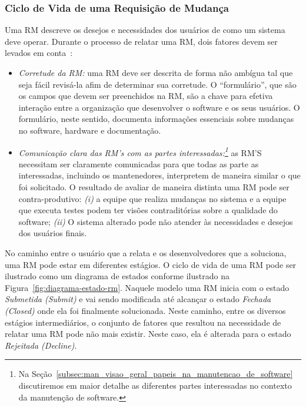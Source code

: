 \subsubsection{Ciclo de Vida de uma Requisição de Mudança}
\label{sub:fluxo_de_trabalho_requisicao_mudanca}

Uma RM descreve os desejos e necessidades dos usuários de como um sistema deve
operar. Durante o processo de relatar uma RM, dois fatores devem ser levados em
conta~\cite{tripathy2014software}:

\begin{itemize}
	\item \textit{Corretude da RM:} uma RM deve ser descrita de forma não
		ambígua tal que seja fácil revisá-la afim de determinar sua corretude. O
		``formulário'', que são os campos que devem ser preenchidos na RM, são a
		chave para efetiva interação entre a organização que desenvolver o
		software e os seus usuários. O formulário, neste sentido, documenta
		informações essenciais sobre mudanças no software, hardware e
		documentação.
   \item \textit{Comunicação clara das RM's com as partes
		   interessadas:\footnote{Na
			   Seção~\ref{subsec:man_visao_geral_papeis_na_manutencao_de_software}
			   discutiremos em maior detalhe as diferentes partes interessadas
			   no contexto da manutenção de software.}} as RM'S necessitam ser
	   claramente comunicadas para que todas as parte as interessadas, incluindo
	   os mantenedores, interpretem de maneira similar o que foi solicitado. O
	   resultado de avaliar de maneira distinta uma RM pode ser
	   contra-produtivo: \textit{(i)} a equipe que realiza mudanças no sistema e
	   a equipe que executa testes podem ter  visões contraditórias sobre a
	   qualidade do software; \textit{(ii)} O sistema alterado pode não atender
	   às necessidades e desejos dos usuários finais.
\end{itemize}

No caminho entre o usuário que a relata e os desenvolvedores que a soluciona,
uma RM pode estar em diferentes estágios. O ciclo de vida de uma RM pode ser
ilustrado como um diagrama de estados conforme ilustrado na
Figura~\ref{fig:diagrama-estado-rm}. Naquele modelo uma RM inicia com o estado
\textit{Submetida (Submit)} e vai sendo modificada até alcançar o estado
\textit{Fechada (Closed)} onde ela foi finalmente solucionada. Neste caminho,
entre os diversos estágios intermediários, o conjunto de fatores que resultou na
necessidade de relatar uma RM pode não mais existir. Neste caso, ela é alterada
para o estado \textit{Rejeitada (Decline)}.

